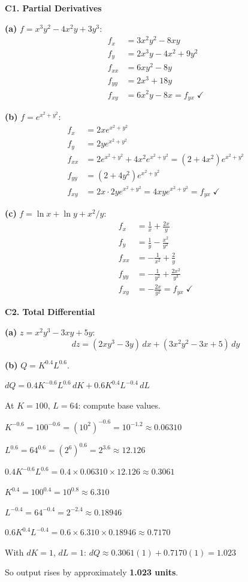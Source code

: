 \documentclass[12pt, a4paper]{article}
\theoremstyle{definition}
\begin{document}
\begin{solbox}
\textbf{C1. Partial Derivatives}

\textbf{(a)} $f=x^3y^2-4x^2y+3y^3$:
\begin{align*}
  f_x &= 3x^2y^2 - 8xy \\
  f_y &= 2x^3y - 4x^2 + 9y^2 \\
  f_{xx} &= 6xy^2 - 8y \\
  f_{yy} &= 2x^3 + 18y \\
  f_{xy} &= 6x^2y - 8x = f_{yx} \;\checkmark
\end{align*}

\textbf{(b)} $f=e^{x^2+y^2}$:
\begin{align*}
  f_x &= 2xe^{x^2+y^2} \\
  f_y &= 2ye^{x^2+y^2} \\
  f_{xx} &= 2e^{x^2+y^2}+4x^2e^{x^2+y^2} = (2+4x^2)e^{x^2+y^2}\\
  f_{yy} &= (2+4y^2)e^{x^2+y^2}\\
  f_{xy} &= 2x\cdot 2ye^{x^2+y^2} = 4xye^{x^2+y^2} = f_{yx}\;\checkmark
\end{align*}

\textbf{(c)} $f=\ln x+\ln y+x^2/y$:
\begin{align*}
  f_x &= \frac{1}{x}+\frac{2x}{y} \\
  f_y &= \frac{1}{y}-\frac{x^2}{y^2} \\
  f_{xx} &= -\frac{1}{x^2}+\frac{2}{y} \\
  f_{yy} &= -\frac{1}{y^2}+\frac{2x^2}{y^3} \\
  f_{xy} &= -\frac{2x}{y^2} = f_{yx}\;\checkmark
\end{align*}
\end{solbox}

\begin{solbox}
\textbf{C2. Total Differential}

\textbf{(a)} $z=x^2y^3-3xy+5y$:
\[
  dz = (2xy^3-3y)\,dx + (3x^2y^2-3x+5)\,dy
\]

\textbf{(b)} $Q=K^{0.4}L^{0.6}$.

$dQ = 0.4K^{-0.6}L^{0.6}\,dK + 0.6K^{0.4}L^{-0.4}\,dL$

At $K=100$, $L=64$: compute base values.

$K^{-0.6} = 100^{-0.6} = (10^2)^{-0.6} = 10^{-1.2} \approx 0.06310$

$L^{0.6} = 64^{0.6} = (2^6)^{0.6} = 2^{3.6} \approx 12.126$

$0.4K^{-0.6}L^{0.6} = 0.4\times 0.06310\times 12.126 \approx 0.3061$

$K^{0.4} = 100^{0.4} = 10^{0.8} \approx 6.310$

$L^{-0.4} = 64^{-0.4} = 2^{-2.4} \approx 0.18946$

$0.6K^{0.4}L^{-0.4} = 0.6\times 6.310\times 0.18946 \approx 0.7170$

With $dK=1$, $dL=1$:
$dQ \approx 0.3061(1) + 0.7170(1) = 1.023$

So output rises by approximately \textbf{1.023 units}.
\end{solbox}
\end{document}
